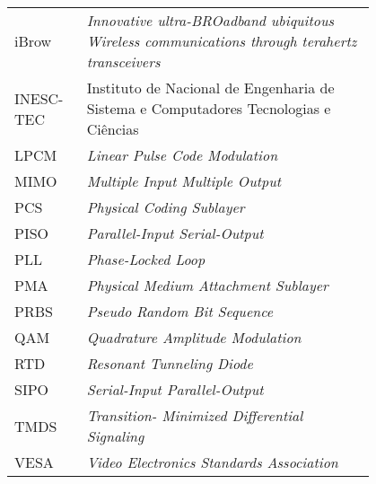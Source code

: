 \begin{flushleft}
\begin{tabular}{l p{0.8\linewidth}}
iBrow 		&	\textit{Innovative ultra-BROadband ubiquitous Wireless communications through terahertz transceivers}	\\
INESC-TEC	&	Instituto de Nacional de Engenharia de Sistema e Computadores Tecnologias e Ciências					\\
LPCM 		&	\textit{Linear Pulse Code Modulation}																	\\
MIMO		&	\textit{Multiple Input Multiple Output}																	\\
PCS			&	\textit{Physical Coding Sublayer}																		\\	
PISO		&	\textit{Parallel-Input Serial-Output}																	\\
PLL			&	\textit{Phase-Locked Loop}																				\\
PMA			&	\textit{Physical Medium Attachment Sublayer}															\\
PRBS		&	\textit{Pseudo Random Bit Sequence}																		\\
QAM			&	\textit{Quadrature Amplitude Modulation}																\\
RTD			&	\textit{Resonant Tunneling Diode}																		\\
SIPO		&	\textit{Serial-Input Parallel-Output}																	\\
TMDS		&	\textit{Transition- Minimized Differential Signaling}													\\
VESA		&	\textit{Video Electronics Standards Association}
\end{tabular}
\end{flushleft}

